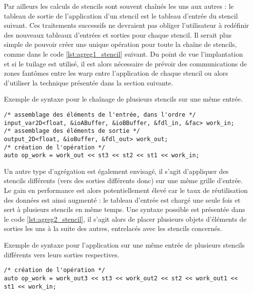Par ailleurs les calculs de stencils sont souvent chaînés les uns aux autres : le tableau de sortie de l'application d'un stencil est le tableau d'entrée du stencil suivant. Ces traitements successifs ne devraient pas obliger l'utilisateur à redéfinir des nouveaux tableaux d'entrées et sorties pour chaque stencil. Il serait plus simple de pouvoir créer une unique opération pour toute la chaîne de stencils, comme dans le code \ref{lst:agreg1_stencil} suivant. Du point de vue l'implantation et si le tuilage est utilisé, il est alors nécessaire de prévoir des communications de zones fantômes entre les warp entre l'application de chaque stencil ou alors d'utiliser la technique présentée dans la section suivante.

\begin{listing}[H]
\caption{Exemple de syntaxe pour le chaînage de plusieurs stencils sur une même entrée.}
\label{lst:agreg1_stencil}
\begin{verbatim}
/* assemblage des éléments de l'entrée, dans l'ordre */
input_var2D<float, &ioABuffer, &ioBBuffer, &fdl_in, &fac> work_in;
/* assemblage des éléments de sortie */
output_2D<float, &ioBuffer, &fdl_out> work_out;
/* création de l'opération */
auto op_work = work_out << st3 << st2 << st1 << work_in;
\end{verbatim}
\end{listing}

Un autre type d'agrégation est également envisagé, il s'agit d'appliquer des stencils différents (vers des sorties différents donc) sur une même grille d'entrée. Le gain en performance est alors potentiellement élevé car le taux de réutilisation des données est ainsi augmenté : le tableau d'entrée est chargé une seule fois et sert à plusieurs stencils en même temps. Une syntaxe possible est présentée dans le code \ref{lst:agreg2_stencil}, il s'agit alors de placer plusieurs objets d'éléments de sorties les uns à la suite des autres, entrelacés avec les stencils concernés. 

\begin{listing}[H]
\caption{Exemple de syntaxe pour l'application sur une même entrée de plusieurs stencils différents vers leurs sorties respectives.}
\label{lst:agreg2_stencil}
\begin{verbatim}
/* création de l'opération */
auto op_work = work_out3 << st3 << work_out2 << st2 << work_out1 << st1 << work_in;
\end{verbatim}
\end{listing}

